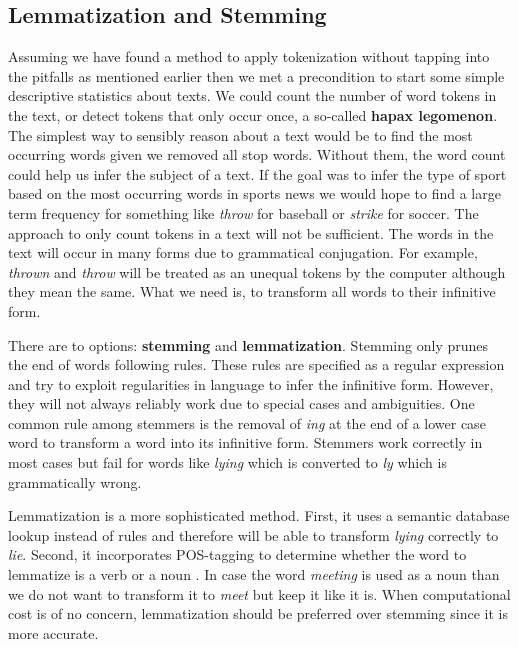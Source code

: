 \subsection{Lemmatization and Stemming}\label{stemming}
Assuming we have found a method to apply tokenization without tapping into the pitfalls as mentioned earlier then we met a precondition to start some simple descriptive statistics about texts.
We could count the number of word tokens in the text, or detect tokens that only occur once, a so-called \textbf{hapax legomenon}.
The simplest way to sensibly reason about a text would be to find the most occurring words given we removed all stop words. Without them, the word count could help us infer the subject of a text.
If the goal was to infer the type of sport based on the most occurring words in sports news we would hope to find a large term frequency for something like \textit{throw} for baseball or \textit{strike} for soccer.
The approach to only count tokens in a text will not be sufficient.
The words in the text will occur in many forms due to grammatical conjugation.
For example, \textit{thrown} and \textit{throw} will be treated as an unequal tokens by the computer although they mean the same.
What we need is, to transform all words to their infinitive form.

There are to options: \textbf{stemming} and \textbf{lemmatization}.
Stemming only prunes the end of words following rules.
These rules are specified as a regular expression and try to exploit regularities in language to infer the infinitive form.
However, they will not always reliably work due to special cases and ambiguities.
One common rule among stemmers is the removal of \textit{ing} at the end of a lower case word to transform a word into its infinitive form. Stemmers work correctly in most cases but fail for words like \textit{lying} which is converted to \textit{ly} which is grammatically wrong.

Lemmatization is a more sophisticated method.
First, it uses a semantic database lookup instead of rules and therefore will be able to transform \textit{lying} correctly to \textit{lie}.
Second, it incorporates POS-tagging to determine whether the word to lemmatize is a verb or a noun \citep{Muller2015}.
In case the word \textit{meeting} is used as a noun than we do not want to transform it to \textit{meet} but keep it like it is. When computational cost is of no concern, lemmatization should be preferred over stemming since it is more accurate\citep{Balakrishnan2014}.


